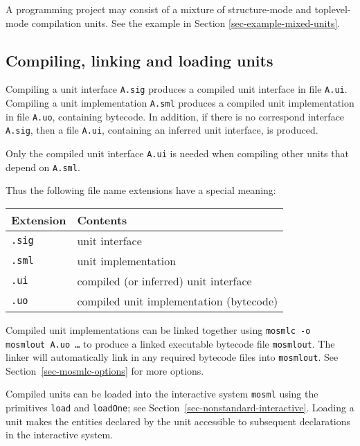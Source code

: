 \documentclass[fleqn,a4paper]{article}
\begin{document}
A programming project may consist of a mixture of structure-mode and
toplevel-mode compilation units. See the example in Section  \ref{sec-example-mixed-units}.
 

\subsection{Compiling, linking and loading units}

Compiling a unit interface \texttt{A.sig} produces a compiled unit
interface in file \texttt{A.ui}\@.  Compiling a unit implementation
\texttt{A.sml} produces a compiled unit implementation in file
\texttt{A.uo}, containing bytecode.  In addition, if there is no
correspond interface \texttt{A.sig}, then a file \texttt{A.ui},
containing an inferred unit interface, is produced.

Only the compiled unit interface \texttt{A.ui} is needed when
compiling other units that depend on \texttt{A.sml}.

Thus the following file name extensions have a special meaning: 

\begin{center}
\begin{tabular}{|l|l|}\hline
Extension & Contents\\\hline
\texttt{.sig} & unit interface\\
\texttt{.sml} & unit implementation\\
\texttt{.ui}  & compiled (or inferred) unit interface\\
\texttt{.uo}  & compiled unit implementation (bytecode)\\\hline
\end{tabular}
\end{center}

\noindent 
Compiled unit implementations can be linked together using {\tt mosmlc
  -o mosmlout A.uo \ldots} to produce a linked executable bytecode
file {\tt mosmlout}.  The linker will automatically link in any
required bytecode files into {\tt mosmlout}.  See
Section~\ref{sec-mosmlc-options} for more options.

Compiled units can be loaded into the interactive system {\tt mosml}
using the primitives {\tt load} and \texttt{loadOne}; see
Section~\ref{sec-nonstandard-interactive}.  Loading a unit makes the
entities declared by the unit accessible to subsequent declarations in
the interactive system.
\end{document}

